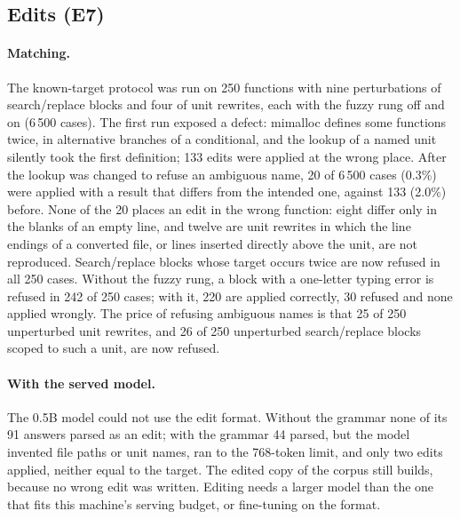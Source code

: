 \documentclass[10pt,twocolumn]{article}
\theoremstyle{definition}
\theoremstyle{remark}
\begin{document}
\subsection{Edits (E7)}
\paragraph{Matching.}
The known-target protocol was run on 250 functions with nine perturbations of search/replace blocks and four of unit rewrites, each with the fuzzy rung off and on (6\,500 cases).
The first run exposed a defect: mimalloc defines some functions twice, in alternative branches of a conditional, and the lookup of a named unit silently took the first definition; 133 edits were applied at the wrong place.
After the lookup was changed to refuse an ambiguous name, 20 of 6\,500 cases (0.3\%) were applied with a result that differs from the intended one, against 133 (2.0\%) before.
None of the 20 places an edit in the wrong function: eight differ only in the blanks of an empty line, and twelve are unit rewrites in which the line endings of a converted file, or lines inserted directly above the unit, are not reproduced.
Search/replace blocks whose target occurs twice are now refused in all 250 cases.
Without the fuzzy rung, a block with a one-letter typing error is refused in 242 of 250 cases; with it, 220 are applied correctly, 30 refused and none applied wrongly. The price of refusing ambiguous names is that 25 of 250 unperturbed unit rewrites, and 26 of 250 unperturbed search/replace blocks scoped to such a unit, are now refused.

\paragraph{With the served model.}
The 0.5B model could not use the edit format.
Without the grammar none of its 91 answers parsed as an edit; with the grammar 44 parsed, but the model invented file paths or unit names, ran to the 768-token limit, and only two edits applied, neither equal to the target.
The edited copy of the corpus still builds, because no wrong edit was written.
Editing needs a larger model than the one that fits this machine's serving budget, or fine-tuning on the format.

\end{document}
